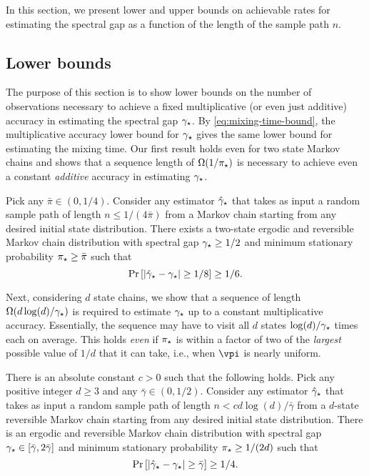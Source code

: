 In this section, we present lower and upper bounds on achievable rates
for estimating the spectral gap as a function of the length of the
sample path $n$.

\subsection{Lower bounds}
\label{sec:rates-lower}
The purpose of this section is to show lower bounds on the number of observations
necessary to achieve a fixed multiplicative (or even just additive) accuracy in estimating the spectral gap $\gamma_{\star}$.
By \cref{eq:mixing-time-bound}, the multiplicative accuracy lower bound for $\gamma_{\star}$
gives the same lower bound for estimating the mixing time.
Our first result holds even for two state Markov chains and shows that a sequence length of $\Omega(1/\pi_{\star})$
is necessary to achieve even a constant \emph{additive} accuracy in estimating $\gamma_{\star}$.
\begin{theorem}
  \label{thm:lb-pimin}
  Pick any $\bar\pi \in (0,1/4)$.
  Consider any estimator $\hat\gamma_{\star}$ that takes as input a random sample
  path of length $n \leq 1/(4\bar\pi)$ from a Markov chain starting
  from any desired initial state distribution.
  There exists a two-state ergodic and reversible Markov chain
  distribution with spectral gap $\gamma_{\star} \geq 1/2$ and minimum
  stationary probability $\pi_{\star} \geq \bar\pi$ such that
  \[
    \Pr\left[ |\hat\gamma_{\star} - \gamma_{\star}| \geq 1/8 \right] \geq 1/6 .
  \]
\end{theorem}
Next, considering $d$ state chains, we show that 
a sequence of length $\Omega(d\log(d)/\gamma_{\star})$ is required
to estimate $\gamma_{\star}$ up to a constant multiplicative accuracy.
Essentially, the sequence may have to visit all $d$ states $\log(d)/\gamma_{\star}$ times each on average.
This holds \emph{even} if $\pi_{\star}$ is within a factor of two of the
\emph{largest} possible value of $1/d$ that it can take, i.e., when
$\vpi$ is nearly uniform.
\begin{theorem}
  \label{thm:lb-gap}
  There is an absolute constant $c>0$ such that the following holds.
  Pick any positive integer $d \geq 3$ and any $\bar\gamma \in
  (0,1/2)$.
  Consider any estimator $\hat\gamma_{\star}$ that takes as input a random sample
  path of length $n < c d\log(d) / \bar\gamma$ from a $d$-state
  reversible Markov chain starting from any desired initial state
  distribution.
  There is an ergodic and reversible Markov chain distribution
  with spectral gap $\gamma_{\star} \in [\bar\gamma,2\bar\gamma]$ and minimum
  stationary probability $\pi_{\star} \geq 1/(2d)$ such that
  \[
    \Pr\left[ |\hat\gamma_{\star} - \gamma_{\star}| \geq \bar\gamma\right] \geq 1/4 .
  \]
\end{theorem}

